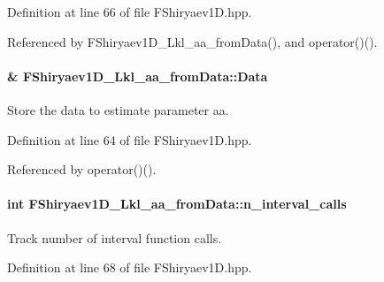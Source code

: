 \-Definition at line 66 of file \-F\-Shiryaev1\-D.\-hpp.



\-Referenced by \-F\-Shiryaev1\-D\-\_\-\-Lkl\-\_\-aa\-\_\-from\-Data(), and operator()().

\hypertarget{classFShiryaev1D__Lkl__aa__fromData_a63bdd5ba904fa6775561cdd28176b337}{
\paragraph[{\-Data}]{\& {\bf \-F\-Shiryaev1\-D\-\_\-\-Lkl\-\_\-aa\-\_\-from\-Data\-::\-Data}}}\label{classFShiryaev1D__Lkl__aa__fromData_a63bdd5ba904fa6775561cdd28176b337}


\-Store the data to estimate parameter aa. 



\-Definition at line 64 of file \-F\-Shiryaev1\-D.\-hpp.



\-Referenced by operator()().

\hypertarget{classFShiryaev1D__Lkl__aa__fromData_a7c759aeef9b7dbe5223ea3a564c60124}{
\paragraph[{n\-\_\-interval\-\_\-calls}]{\setlength{\rightskip}{0pt plus 5cm}int {\bf \-F\-Shiryaev1\-D\-\_\-\-Lkl\-\_\-aa\-\_\-from\-Data\-::n\-\_\-interval\-\_\-calls}}}\label{classFShiryaev1D__Lkl__aa__fromData_a7c759aeef9b7dbe5223ea3a564c60124}


\-Track number of interval function calls. 



\-Definition at line 68 of file \-F\-Shiryaev1\-D.\-hpp.




